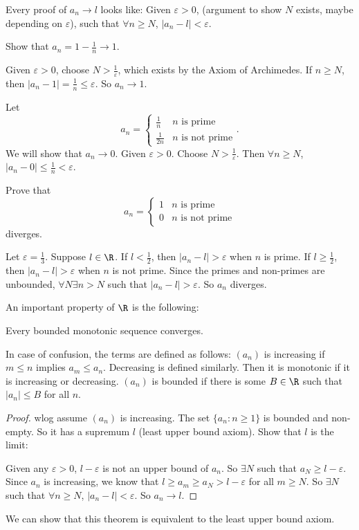 \documentclass[a4paper]{article}
\begin{document}
Every proof of $a_n \to l$ looks like: Given $\varepsilon > 0$, (argument to show $N$ exists, maybe depending on $\varepsilon$), such that $\forall n\geq N$, $|a_n - l| < \varepsilon$.
\begin{eg}
  Show that $a_n = 1 - \frac{1}{n} \to 1$.

  Given $\varepsilon > 0$, choose $N > \frac{1}{\varepsilon}$, which exists by the Axiom of Archimedes. If $n \geq N$, then $|a_n - 1| = \frac{1}{n} \leq \varepsilon$. So $a_n\to 1$.
\end{eg}

\begin{eg}
  Let
  \[
    a_n = \begin{cases}\frac{1}{n} & n\text{ is prime}\\ \frac{1}{2n} & n\text{ is not prime}\end{cases}.
  \]
  We will show that $a_n \to 0$. Given $\varepsilon > 0$. Choose $N > \frac{1}{\varepsilon}$. Then $\forall n\geq N$, $|a_n - 0| \leq \frac{1}{n} < \varepsilon$.
\end{eg}

\begin{eg}
  Prove that
  \[
    a_n = \begin{cases}1 & n\text{ is prime}\\ 0 & n\text{ is not prime}\end{cases}
  \]
  diverges.

  Let $\varepsilon = \frac{1}{3}$. Suppose $l\in \R$. If $l < \frac{1}{2}$, then $|a_n - l| > \varepsilon$ when $n$ is prime. If $l\geq \frac{1}{2}$, then $|a_n - l| > \varepsilon$ when $n$ is not prime. Since the primes and non-primes are unbounded, $\forall N\exists n > N$ such that $|a_n - l| > \varepsilon$. So $a_n$ diverges.
\end{eg}

An important property of $\R$ is the following:
\begin{thm}
  Every bounded monotonic sequence converges.
\end{thm}
In case of confusion, the terms are defined as follows: $(a_n)$ is increasing if $m \leq n$ implies $a_m \leq a_n$. Decreasing is defined similarly. Then it is monotonic if it is increasing or decreasing. $(a_n)$ is bounded if there is some $B\in \R$ such that $|a_n| \leq B$ for all $n$.

\begin{proof}
  wlog assume $(a_n)$ is increasing. The set $\{a_n: n\geq 1\}$ is bounded and non-empty. So it has a supremum $l$ (least upper bound axiom). Show that $l$ is the limit:

  Given any $\varepsilon >0$, $l - \varepsilon$ is not an upper bound of $a_n$. So $\exists N$ such that $a_N \geq l - \varepsilon$. Since $a_n$ is increasing, we know that $l \geq a_m \geq a_N > l - \varepsilon$ for all $m \geq N$. So $\exists N $ such that $\forall n\geq N$, $|a_n - l| < \varepsilon$. So $a_n \to l$.
\end{proof}
We can show that this theorem is equivalent to the least upper bound axiom.
\end{document}
